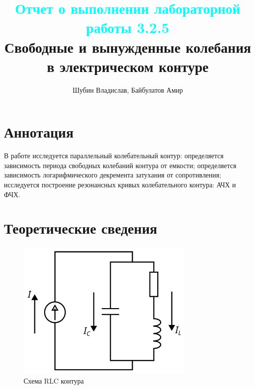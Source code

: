 \documentclass[
a4paper, %
12pt, %
]{article}
\title{
	\textcolor{cyan}{Отчет о выполнении лабораторной работы 3.2.5}
	\\
	Свободные и вынужденные колебания в электрическом контуре
}
\author{Шубин Владислав, Байбулатов Амир}
\begin{document}
    
	
	\maketitle
	
	\section{Аннотация}
	
	В работе исследуется параллельный колебательный контур: определяется зависимость периода свободных колебаний контура от емкости; определяется зависимость логарифмического декремента затухания от сопротивления; исследуется построение резонансных кривых колебательного контура: АЧХ и ФЧХ.
	
	\section{Теоретические сведения}
	
	\begin{figure}[h]
		\centering
		\includegraphics[width=0.74\linewidth]{img/scheme}
		\caption[RLC]{Схема RLC контура}
		\label{fig:scheme}
	\end{figure}
	
	
\end{document}
